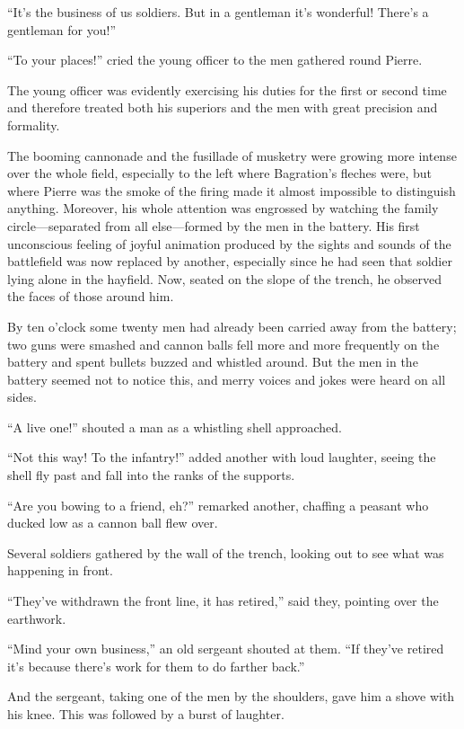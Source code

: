``It's the business of us soldiers. But in a gentleman it's
wonderful!  There's a gentleman for you!''

``To your places!'' cried the young officer to the men gathered
round Pierre.

The young officer was evidently exercising his duties for the
first or second time and therefore treated both his superiors and
the men with great precision and formality.

The booming cannonade and the fusillade of musketry were growing
more intense over the whole field, especially to the left where
Bagration's fleches were, but where Pierre was the smoke of the
firing made it almost impossible to distinguish
anything. Moreover, his whole attention was engrossed by watching
the family circle---separated from all else---formed by the men
in the battery. His first unconscious feeling of joyful animation
produced by the sights and sounds of the battlefield was now
replaced by another, especially since he had seen that soldier
lying alone in the hayfield. Now, seated on the slope of the
trench, he observed the faces of those around him.

By ten o'clock some twenty men had already been carried away from
the battery; two guns were smashed and cannon balls fell more and
more frequently on the battery and spent bullets buzzed and
whistled around.  But the men in the battery seemed not to notice
this, and merry voices and jokes were heard on all sides.

``A live one!'' shouted a man as a whistling shell approached.

``Not this way! To the infantry!'' added another with loud
laughter, seeing the shell fly past and fall into the ranks of
the supports.

``Are you bowing to a friend, eh?'' remarked another, chaffing a
peasant who ducked low as a cannon ball flew over.

Several soldiers gathered by the wall of the trench, looking out
to see what was happening in front.

``They've withdrawn the front line, it has retired,'' said they,
pointing over the earthwork.

``Mind your own business,'' an old sergeant shouted at them. ``If
they've retired it's because there's work for them to do farther
back.''

And the sergeant, taking one of the men by the shoulders, gave
him a shove with his knee. This was followed by a burst of
laughter.

